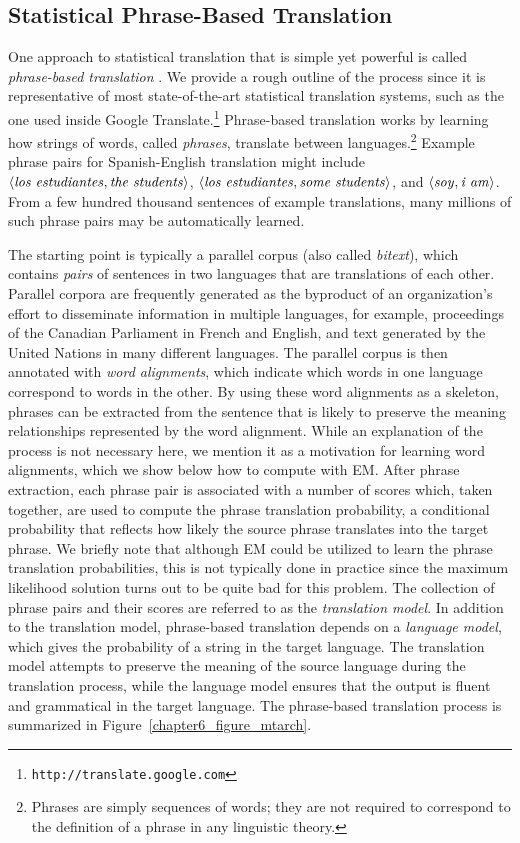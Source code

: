\subsection{Statistical Phrase-Based Translation}

One approach to statistical translation that is simple yet powerful is
called \emph{phrase-based translation} \cite{Koehn_2003}.  We provide
a rough outline of the process since it is representative of most
state-of-the-art statistical translation systems, such as the one used
inside Google Translate.\footnote{\texttt{http://translate.google.com}}
Phrase-based translation works by learning how strings of words,
called \emph{phrases}, translate between languages.\footnote{Phrases
  are simply sequences of words; they are not required to correspond
  to the definition of a phrase in any linguistic theory.}  Example
phrase pairs for Spanish-English translation might include $\langle
\textrm{\emph{los estudiantes}}, \textrm{\emph{the students}}\rangle$,
$\langle \textrm{\emph{los estudiantes}}, \textrm{\emph{some
    students}}\rangle$, and $\langle \textrm{\emph{soy}},
\textrm{\emph{i am}} \rangle$.  From a few hundred thousand sentences
of example translations, many millions of such phrase pairs may be
automatically learned.

The starting point is typically a parallel corpus (also called \emph{
  bitext}), which contains \emph{pairs} of sentences in two languages
that are translations of each other. Parallel corpora are frequently
generated as the byproduct of an organization's effort to disseminate
information in multiple languages, for example, proceedings of the
Canadian Parliament in French and English, and text generated by the
United Nations in many different languages.  The parallel corpus is
then annotated with \emph{word alignments}, which indicate which words
in one language correspond to words in the other.  By using these word
alignments as a skeleton, phrases can be extracted from the sentence
that is likely to preserve the meaning relationships represented by
the word alignment.  While an explanation of the process is not
necessary here, we mention it as a motivation for learning word
alignments, which we show below how to compute with EM.  After phrase
extraction, each phrase pair is associated with a number of scores
which, taken together, are used to compute the phrase translation
probability, a conditional probability that reflects how likely the
source phrase translates into the target phrase.  We briefly note that
although EM could be utilized to learn the phrase translation
probabilities, this is not typically done in practice since the
maximum likelihood solution turns out to be quite bad for this
problem.  The collection of phrase pairs and their scores are referred
to as the \emph{translation model}.  In addition to the translation
model, phrase-based translation depends on a \emph{language model},
which gives the probability of a string in the target language.  The
translation model attempts to preserve the meaning of the source
language during the translation process, while the language model
ensures that the output is fluent and grammatical in the target
language.  The phrase-based translation process is summarized in
Figure~\ref{chapter6_figure_mtarch}.

